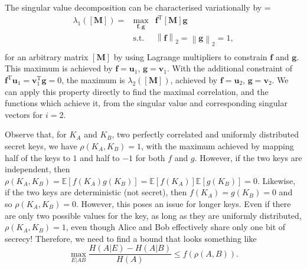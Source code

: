 \documentclass[10pt, a4paper]{article}
\newcommand{\norm}[1]{\left\lVert#1\right\rVert}
\newcommand{\?}{\mathrel{?}} %
\newcommand{\cvec}[1]{\boldsymbol{\mathbf{#1}}}    %
\newcommand{\rvec}[1]{\boldsymbol{\mathbf{#1}}^{\mathrm{T}}} %
\newcommand{\matr}[1]{\left[\mathbf{#1}\right]} %
\newcommand{\E}{\mathbb{E}} %
\newenvironment{Array}[1] %
{\def\arraystretch{1.75}\everymath={\displaystyle}\begin{equation}\begin{array}{#1}}
{\end{array}\end{equation}}
\numberwithin{equation}{section} %
\theoremstyle{definition}
\theoremstyle{plain}
\theoremstyle{plain}
\begin{document}
    The singular value decomposition can be characterised variationally by
    \begin{Array}{rcl}
      \lambda_1(\matr{M}) = & \max_{\cvec{f},\cvec{g}} & \rvec{f} \matr{M} \cvec{g} \\
                            & \text{s.t.} & \norm{\cvec{f}}_2 = \norm{\cvec{g}}_2 = 1, \\
    \end{Array}
    for an arbitrary matrix \(\matr{M}\) by using Lagrange multipliers to constrain \(\cvec{f}\) and \(\cvec{g}\). This maximum is achieved by \(\cvec{f} = \cvec{u}_1\), \(\cvec{g} = \cvec{v}_1\). With the additional constraint of \(\rvec{f} \cvec{u}_1 = \rvec{v}_1 \cvec{g} = 0\), the maximum is \(\lambda_2(\matr{M})\), achieved by \(\cvec{f} = \cvec{u}_2\), \(\cvec{g} = \cvec{v}_2\). We can apply this property directly to find the maximal correlation, and the functions which achieve it, from the singular value and corresponding singular vectors for \(i = 2\).

    Observe that, for \(K_A\) and \(K_B\), two perfectly correlated and uniformly distributed secret keys, we have \(\rho(K_A, K_B) = 1\), with the maximum achieved by mapping half of the keys to \(1\) and half to \(-1\) for both \(f\) and \(g\). However, if the two keys are independent, then \(\rho(K_A,K_B) = \E[f(K_A)g(K_B)] = \E[f(K_A)]\E[g(K_B)] = 0\). Likewise, if the two keys are deterministic (not secret), then \(f(K_A) = g(K_B) = 0\) and so \(\rho(K_A, K_B) = 0\). However, this poses an issue for longer keys. Even if there are only two possible values for the key, as long as they are uniformly distributed, \(\rho(K_A, K_B) = 1\), even though Alice and Bob effectively share only one bit of secrecy! Therefore, we need to find a bound that looks something like
    \begin{equation}
      \max_{E|AB} \frac{H(A|E) - H(A|B)}{H(A)} \leq f(\rho(A,B)).
    \end{equation}
\end{document}
